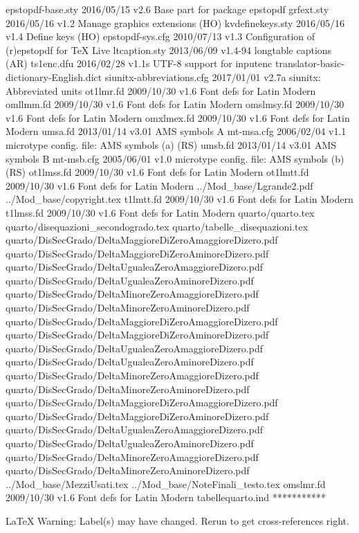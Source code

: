 epstopdf-base.sty    2016/05/15 v2.6 Base part for package epstopdf
  grfext.sty    2016/05/16 v1.2 Manage graphics extensions (HO)
kvdefinekeys.sty    2016/05/16 v1.4 Define keys (HO)
epstopdf-sys.cfg    2010/07/13 v1.3 Configuration of (r)epstopdf for TeX Live
ltcaption.sty    2013/06/09 v1.4-94 longtable captions (AR)
  ts1enc.dfu    2016/02/28 v1.1s UTF-8 support for inputenc
translator-basic-dictionary-English.dict    
siunitx-abbreviations.cfg    2017/01/01 v2.7a siunitx: Abbreviated units
  ot1lmr.fd    2009/10/30 v1.6 Font defs for Latin Modern
  omllmm.fd    2009/10/30 v1.6 Font defs for Latin Modern
 omslmsy.fd    2009/10/30 v1.6 Font defs for Latin Modern
 omxlmex.fd    2009/10/30 v1.6 Font defs for Latin Modern
    umsa.fd    2013/01/14 v3.01 AMS symbols A
  mt-msa.cfg    2006/02/04 v1.1 microtype config. file: AMS symbols (a) (RS)
    umsb.fd    2013/01/14 v3.01 AMS symbols B
  mt-msb.cfg    2005/06/01 v1.0 microtype config. file: AMS symbols (b) (RS)
 ot1lmss.fd    2009/10/30 v1.6 Font defs for Latin Modern
 ot1lmtt.fd    2009/10/30 v1.6 Font defs for Latin Modern
../Mod_base/Lgrande2.pdf
../Mod_base/copyright.tex
  t1lmtt.fd    2009/10/30 v1.6 Font defs for Latin Modern
  t1lmss.fd    2009/10/30 v1.6 Font defs for Latin Modern
quarto/quarto.tex
quarto/disequazioni_secondogrado.tex
quarto/tabelle_disequazioni.tex
quarto/DisSecGrado/DeltaMaggioreDiZeroAmaggioreDizero.pdf
quarto/DisSecGrado/DeltaMaggioreDiZeroAminoreDizero.pdf
quarto/DisSecGrado/DeltaUgualeaZeroAmaggioreDizero.pdf
quarto/DisSecGrado/DeltaUgualeaZeroAminoreDizero.pdf
quarto/DisSecGrado/DeltaMinoreZeroAmaggioreDizero.pdf
quarto/DisSecGrado/DeltaMinoreZeroAminoreDizero.pdf
quarto/DisSecGrado/DeltaMaggioreDiZeroAmaggioreDizero.pdf
quarto/DisSecGrado/DeltaMaggioreDiZeroAminoreDizero.pdf
quarto/DisSecGrado/DeltaUgualeaZeroAmaggioreDizero.pdf
quarto/DisSecGrado/DeltaUgualeaZeroAminoreDizero.pdf
quarto/DisSecGrado/DeltaMinoreZeroAmaggioreDizero.pdf
quarto/DisSecGrado/DeltaMinoreZeroAminoreDizero.pdf
quarto/DisSecGrado/DeltaMaggioreDiZeroAmaggioreDizero.pdf
quarto/DisSecGrado/DeltaMaggioreDiZeroAminoreDizero.pdf
quarto/DisSecGrado/DeltaUgualeaZeroAmaggioreDizero.pdf
quarto/DisSecGrado/DeltaUgualeaZeroAminoreDizero.pdf
quarto/DisSecGrado/DeltaMinoreZeroAmaggioreDizero.pdf
quarto/DisSecGrado/DeltaMinoreZeroAminoreDizero.pdf
../Mod_base/MezziUsati.tex
../Mod_base/NoteFinali_testo.tex
  omslmr.fd    2009/10/30 v1.6 Font defs for Latin Modern
tabellequarto.ind
 ***********


LaTeX Warning: Label(s) may have changed. Rerun to get cross-references right.


